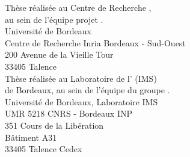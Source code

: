 \thispagestyle{empty}

\vspace*{\fill}

\begin{center}
Thèse réalisée au Centre de Recherche ,\\
au sein de l'équipe projet .\\
\vspace*{1em}
Université de Bordeaux\\
Centre de Recherche Inria Bordeaux - Sud-Ouest\\
200 Avenue de la Vieille Tour\\
33405 Talence\\

\vspace*{2em}
Thèse réalisée au Laboratoire de l' (IMS)\\
de Bordeaux, au sein de l'équipe  du groupe .\\
\vspace*{1em}
Université de Bordeaux, Laboratoire IMS\\
UMR 5218 CNRS - Bordeaux INP\\
351 Cours de la Libération\\
Bâtiment A31\\
33405 Talence Cedex\\

\end{center}